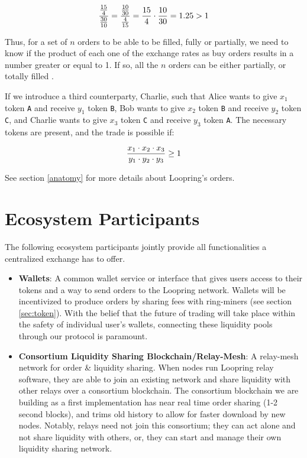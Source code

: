 \documentclass[UTF8,nofonts]{article}
\begin{document}
\begin{multicols}{2}
\begin{equation}
{{15\over 4} \over {30\over 10}} = {{10\over 30} \over {4\over 15}}={15 \over 4} \cdot {10 \over 30} = 1.25 > 1
\end{equation}

Thus, for a set of $n$ orders to be able to be filled, fully or partially, we need to know if the product of each one of the exchange rates as buy orders results in a number greater or equal to 1. If so, all the $n$ orders can be either partially, or totally filled \cite{supersymmetry}.

If we introduce a third counterparty, Charlie, such that  Alice wants to give $x_1$ token \verb|A| and receive $y_1$ token \verb|B|, Bob wants to give $x_2$ token \verb|B| and receive $y_2$ token \verb|C|, and Charlie wants to give $x_3$ token \verb|C| and receive $y_3$ token \verb|A|. The necessary tokens are present, and the trade is possible if:

\begin{equation}
{{x_1 \cdot x_2 \cdot x_3 \over y_1 \cdot y_2 \cdot y_3} \geq 1}
\end{equation}


See section \ref{anatomy} for more details about Loopring's orders.



\section{Ecosystem Participants\label{sec:ecosystem}}
The following ecosystem participants jointly provide all functionalities a centralized exchange has to offer. 

\begin{itemize}

\item \textbf{Wallets}: A common wallet service or interface that gives users access to their tokens and a way to send orders to the Loopring network. Wallets will be incentivized to produce orders by sharing fees with ring-miners (see section \ref{sec:token}). With the belief that the future of trading will take place within the safety of individual user's wallets, connecting these liquidity pools through our protocol is paramount.

\item \textbf{Consortium Liquidity Sharing Blockchain/Relay-Mesh}: A relay-mesh network for order \& liquidity sharing. When nodes run Loopring relay software, they are able to join an existing network and share liquidity with other relays over a consortium blockchain. The consortium blockchain we are building as a first implementation has near real time order sharing (1-2 second blocks), and trims old history to allow for faster download by new nodes. Notably, relays need not join this consortium; they can act alone and not share liquidity with others, or, they can start and manage their own liquidity sharing network.


\end{itemize}
\end{multicols}
\end{document}
